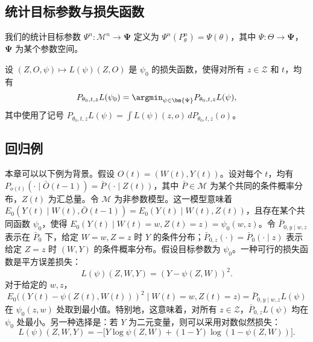 \subsection{统计目标参数与损失函数}

我们的统计目标参数 $\Psi^n:\mathcal M^n\to\bm{\Psi}$ 定义为 $\Psi^n(P_\theta^n)=\Psi(\theta)$，其中 $\Psi:\Theta\to\bm{\Psi}$，$\bm{\Psi}$ 为某个参数空间。

设 $(Z,O,\psi)\mapsto L(\psi)(Z,O)$ 是 $\psi_0$ 的损失函数，使得对所有 $z\in\mathcal Z$ 和 $t$，均有
\[
 P_{\theta_0,t,z}L(\psi_0)
 =\argmin_{\psi\in\bm{\Psi}}P_{\theta_0,t,z}L(\psi),
\]
其中使用了记号 $P_{\theta_0,t,z}L(\psi)=\int L(\psi)(z,o)\,dP_{\theta_0,t,z}(o)$。

\subsection{回归例}

本章可以以下例为背景。假设 $O(t)=(W(t),Y(t))$。设对每个 $t$，均有 $P_{o(t)}(\cdot\mid\bar O(t-1))=\bar P(\cdot\mid Z(t))$，其中 $\bar P\in\mathcal M$ 为某个共同的条件概率分布，$Z(t)$ 为汇总量。令 $\mathcal M$ 为非参数模型。这一模型意味着 $E_0(Y(t)\mid W(t),\bar O(t-1))=E_0(Y(t)\mid W(t),Z(t))$，且存在某个共同函数 $\psi_0$，使得 $E_0(Y(t)\mid W(t)=w,Z(t)=z)=\psi_0(w,z)$。令 $\bar P_{0,y\mid w,z}$ 表示在 $\bar P_0$ 下，给定 $W=w,Z=z$ 时 $Y$ 的条件分布；$\bar P_{0,z}(\cdot)=\bar P_0(\cdot\mid z)$ 表示给定 $Z=z$ 时 $(W,Y)$ 的条件概率分布。假设目标参数为 $\psi_0$。一种可行的损失函数是平方误差损失：
\[
 L(\psi)(Z,W,Y)=(Y-\psi(Z,W))^2.
\]
对于给定的 $w,z$，
\[
 E_0\bigl((Y(t)-\psi(Z(t),W(t)))^2\mid W(t)=w,Z(t)=z\bigr)
 =\bar P_{0,y\mid w,z}L(\psi)
\]
在 $\psi_0(z,w)$ 处取到最小值。特别地，这意味着，对所有 $z\in\mathcal Z$，$\bar P_{0,z}L(\psi)$ 均在 $\psi_0$ 处最小。另一种选择是：若 $Y$ 为二元变量，则可以采用对数似然损失：
\[
 L(\psi)(Z,W,Y)
 =-\bigl[Y\log\psi(Z,W)+(1-Y)\log(1-\psi(Z,W))\bigr].
\]
